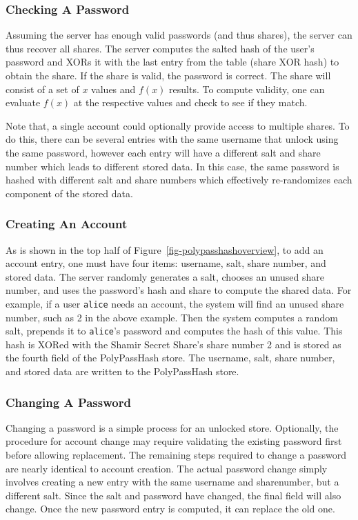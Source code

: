 \subsubsection{Checking A Password}

Assuming the server has enough valid passwords (and thus shares), the server 
can thus recover all shares.
The server computes the salted hash of the user's password and
XORs it with the last entry from the table (share XOR hash) to obtain 
the share.   If the share is valid, the password is correct.   The share will
consist of a set of $x$ values and $f(x)$ results.   To compute validity, 
one can evaluate $f(x)$ at the respective values and check to see if they
match.

Note that, a single account could optionally provide access 
to multiple shares.
To do this, there can be several entries with the same username that unlock 
using the same password, however each entry will have a different
salt and share number which leads to different stored data.   In this
case, the same password is hashed with different salt
and share numbers which effectively re-randomizes each component of
the stored data.

\subsubsection{Creating An Account}


As is shown in the top half of Figure~\ref{fig-polypasshashoverview}, 
to add an account entry, one must have four items: username, salt, share
number, and stored data.   The server
randomly generates a salt, chooses an
unused share number, and uses the password's hash and share to
compute the shared data.   For example, if a user {\tt alice} needs an
account, the system will find an unused share number, such as 2 in the
above example.   Then the system computes a random salt, prepends
it to {\tt alice}'s password and computes the hash of this value.
This hash is XORed with the Shamir Secret Share's share number 2 and is stored
as the fourth field of the PolyPassHash store.   The username, salt, share
number, and stored data are written to the PolyPassHash store.


\subsubsection{Changing A Password}

Changing a password is a simple process for an unlocked store.  
Optionally, the procedure for account change may require validating the 
existing password first before allowing replacement.  The remaining steps 
required to change a password are nearly identical to account creation.  
The actual password change simply 
involves creating a new entry with the same username and sharenumber, but 
a different salt.  Since the salt and password have changed, the final
field will also change.   Once the new password entry is computed, it 
can replace the old one.   

